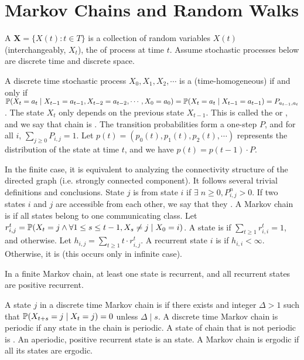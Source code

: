 \documentclass[main.tex]{subfiles}
\begin{document}
\minispacing

\section{Markov Chains and Random Walks}

A  $\mathbf{X}=\{X(t) : t \in T\}$ is a collection of random variables $X(t)$ (interchangeably, $X_t$), the  of process at time $t$. Assume stochastic processes below are discrete time and discrete space.

A discrete time stochastic process $X_0,X_1,X_2,\cdots$ is a (time-homogeneous)  if and only if $\mathbb{P}(X_t=a_t\mid X_{t-1}=a_{t-1},X_{t-2}=a_{t-2},\cdots,X_0=a_0)=\mathbb{P}(X_t=a_t\mid X_{t-1}=a_{t-1})=P_{a_{t-1},a_{t}}$. The state $X_t$ only depends on the previous state $X_{t-1}$. This is called the  or , and we say that chain is . The transition probabilities form a one-step  $P$, and for all $i$, $\sum_{j\ge 0}P_{i,j}=1$. Let $p(t) = (p_0(t),p_1(t),p_2(t),\cdots)$ represents the distribution of the state at time $t$, and we have $p(t)=p(t-1)\cdot P$.

In the finite case, it is equivalent to analyzing the connectivity structure of the directed graph (i.e. strongly connected component). It follows several trivial definitions and conclusions. State $j$ is  from state $i$ if $\exists\;\! n\ge 0,P^n_{i,j}>0$. If two states $i$ and $j$ are accessible from each other, we say that they . A Markov chain is  if all states belong to one communicating class. Let $r^t_{i,j}=\mathbb{P}(X_t=j \wedge \forall 1\le s\le t-1,X_s\not=j \mid X_0=i)$. A state is  if $\sum_{t\ge 1}r^t_{i,i}=1$, and  otherwise. Let $h_{i,j}=\sum_{t\ge 1}t\cdot r^t_{i,j}$. A recurrent state $i$ is  if $h_{i,i}<\infty$. Otherwise, it is  (this occurs only in infinite case).

\begin{lemma}
	In a finite Markov chain, at least one state is recurrent, and all recurrent states are positive recurrent.
\end{lemma}

A state $j$ in a discrete time Markov chain is  if there exists and integer $\Delta > 1$ such that $\mathbb{P}(X_{t+s}=j\mid X_t=j)=0$ unless $\Delta \mid s$. A discrete time Markov chain is periodic if any state in the chain is periodic. A state of chain that is not periodic is . An aperiodic, positive recurrent state is an  state. A Markov chain is ergodic if all its states are ergodic.
\end{document}
